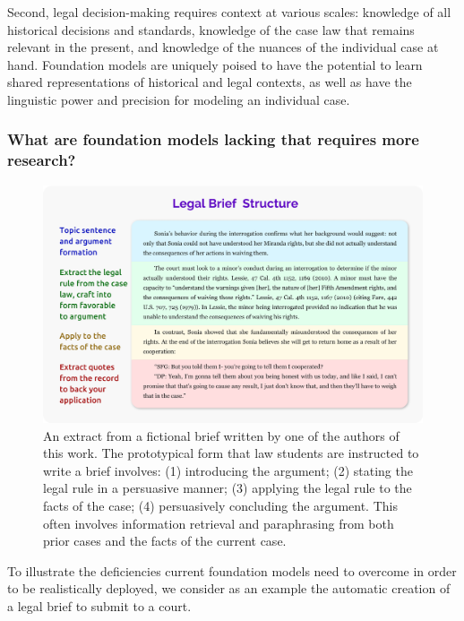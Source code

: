 Second, legal decision-making requires context at various scales: knowledge of all historical decisions and standards, knowledge of the case law that remains relevant in the present, and knowledge of the nuances of the individual case at hand. Foundation models are uniquely poised to have the potential to learn shared representations of historical and legal contexts, as well as have the linguistic power and precision for modeling an individual case. 

\subsubsection{What are foundation models lacking that requires more research?}

\begin{figure}[t]
  \centering
\includegraphics[width=\linewidth]{applications/law_figs/Law_brief.png}
\caption{\label{fig:law} An extract from a fictional brief written by one of the authors of this work. The prototypical form that law students are instructed to write a brief involves: (1) introducing the argument; (2) stating the legal rule in a persuasive manner; (3) applying the legal rule to the facts of the case; (4) persuasively concluding the argument. This often involves information retrieval and paraphrasing from both prior cases and the facts of the current case.}
\end{figure}

To illustrate the deficiencies current foundation models need to overcome in order to be realistically deployed, we consider as an example the automatic creation of a legal brief to submit to a court.

